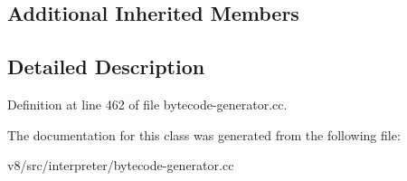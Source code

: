 \subsection*{Additional Inherited Members}


\subsection{Detailed Description}


Definition at line 462 of file bytecode-\/generator.\+cc.



The documentation for this class was generated from the following file\+:\begin{DoxyCompactItemize}
\item 
v8/src/interpreter/bytecode-\/generator.\+cc\end{DoxyCompactItemize}
